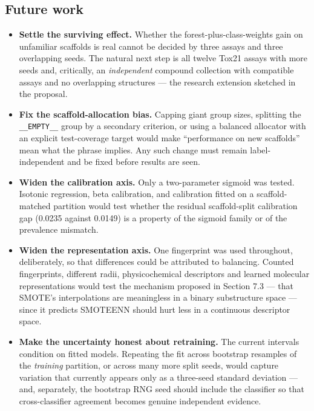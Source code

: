 \documentclass[10pt,letterpaper]{article}
\begin{document}
\subsection{Future work}

\begin{itemize}\setlength{\itemsep}{1pt}
\item \textbf{Settle the surviving effect.} Whether the forest-plus-class-weights gain on unfamiliar
scaffolds is real cannot be decided by three assays and three overlapping seeds. The natural next
step is all twelve Tox21 assays with more seeds and, critically, an \emph{independent} compound
collection with compatible assays and no overlapping structures --- the research extension sketched
in the proposal.
\item \textbf{Fix the scaffold-allocation bias.} Capping giant group sizes, splitting the
\texttt{\_\_EMPTY\_\_} group by a secondary criterion, or using a balanced allocator with an explicit
test-coverage target would make ``performance on new scaffolds'' mean what the phrase implies. Any
such change must remain label-independent and be fixed before results are seen.
\item \textbf{Widen the calibration axis.} Only a two-parameter sigmoid was tested. Isotonic
regression, beta calibration, and calibration fitted on a scaffold-matched partition would test
whether the residual scaffold-split calibration gap (0.0235 against 0.0149) is a property of the
sigmoid family or of the prevalence mismatch.
\item \textbf{Widen the representation axis.} One fingerprint was used throughout, deliberately, so
that differences could be attributed to balancing. Counted fingerprints, different radii,
physicochemical descriptors and learned molecular representations would test the mechanism proposed
in Section 7.3 --- that SMOTE's interpolations are meaningless in a binary substructure space ---
since it predicts SMOTEENN should hurt less in a continuous descriptor space.
\item \textbf{Make the uncertainty honest about retraining.} The current intervals condition on
fitted models. Repeating the fit across bootstrap resamples of the \emph{training} partition, or
across many more split seeds, would capture variation that currently appears only as a three-seed
standard deviation --- and, separately, the bootstrap RNG seed should include the classifier so that
cross-classifier agreement becomes genuine independent evidence.
\end{itemize}
\end{document}
